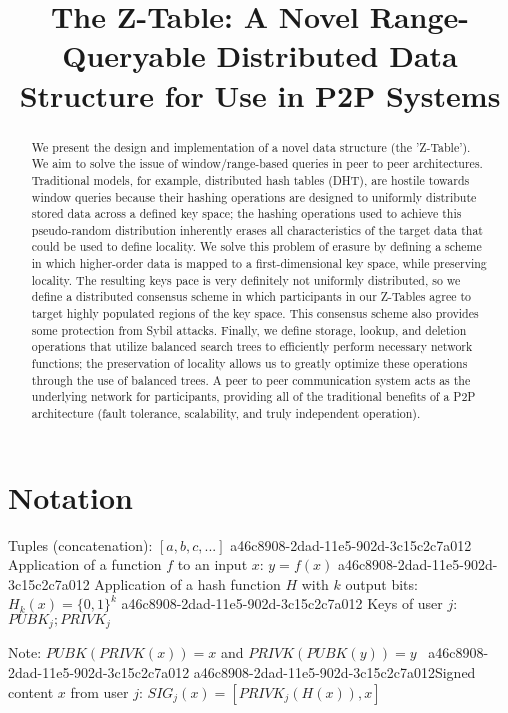 \documentclass[12pt]{article}
\title{The Z-Table: A Novel Range-Queryable Distributed Data Structure for Use in P2P Systems}
\begin{document}
\maketitle

\begin{abstract}
We present the design and implementation of a novel data structure (the 'Z-Table'). We aim to solve the issue of window/range-based queries in peer to peer architectures. Traditional models, for example,  distributed hash tables (DHT), are hostile towards window queries because their hashing operations are designed to uniformly distribute stored data across a defined key space; the hashing operations used to achieve this pseudo-random distribution inherently erases all characteristics of the target data that could be used to define locality. We solve this problem of erasure by defining a scheme in which higher-order data is mapped to a first-dimensional key space, while preserving locality. The resulting keys pace is very definitely not uniformly distributed, so we define a distributed consensus scheme in which participants in our Z-Tables agree to target highly populated regions of the key space. This consensus scheme also provides some protection from Sybil attacks. Finally, we define storage, lookup, and deletion operations that utilize balanced search trees to efficiently perform necessary network functions; the preservation of locality allows us to greatly optimize these operations through the use of balanced trees. A peer to peer communication system acts as the underlying network for participants, providing all of the traditional benefits of a P2P architecture (fault tolerance, scalability, and truly independent operation).
\end{abstract}

\section{Notation}

Tuples (concatenation): $[a,b,c,...]$
a46c8908-2dad-11e5-902d-3c15c2c7a012
Application of a function $f$ to an input $x$: $y=f(x)$
a46c8908-2dad-11e5-902d-3c15c2c7a012
Application of a hash function $H$ with $k$ output bits: $H_{k}(x) = \{0,1\}^k$
a46c8908-2dad-11e5-902d-3c15c2c7a012
Keys of user $j$: $ PUBK_j; PRIVK_j $

Note: $PUBK(PRIVK(x)) = x$ and $PRIVK(PUBK(y)) = y$~
a46c8908-2dad-11e5-902d-3c15c2c7a012
a46c8908-2dad-11e5-902d-3c15c2c7a012Signed content $x$ from user $j$: $SIG_j(x) = \left[ PRIVK_j( H(x) ), x \right]$
\end{document}
